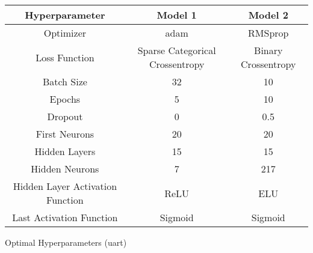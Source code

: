 \begin{tabular}{|c|c|c|}
    \hline
    Hyperparameter & Model 1 & Model 2\\
    \hline
    \hline
    Optimizer & adam &  RMSprop \\
    \hline
    Loss Function & Sparse Categorical Crossentropy &  Binary Crossentropy \\
    \hline
    Batch Size & 32 & 10\\
    \hline
    Epochs & 5 & 10\\
    \hline
    Dropout & 0 & 0.5 \\
    \hline
    First Neurons & 20 & 20\\
    \hline
    Hidden Layers & 15 & 15\\
    \hline
    Hidden Neurons & 7 & 217\\
    \hline
    Hidden Layer Activation Function & ReLU & ELU\\
    \hline
    Last Activation Function & Sigmoid & Sigmoid\\
    \hline
\end{tabular}
\caption{Optimal Hyperparameters (uart)}
\label{tab:Optimal Hyperparameters uart}